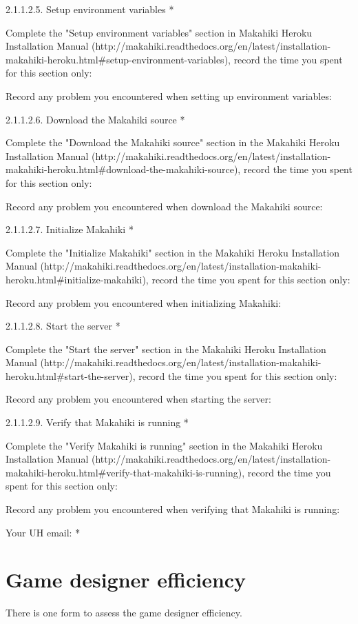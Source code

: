 2.1.1.2.5. Setup environment variables *

Complete the "Setup environment variables" section in Makahiki Heroku Installation Manual (http://makahiki.readthedocs.org/en/latest/installation-makahiki-heroku.html\#setup-environment-variables), record the time you spent for this section only:

Record any problem you encountered when setting up environment variables:

2.1.1.2.6. Download the Makahiki source *

Complete the "Download the Makahiki source" section in the Makahiki Heroku Installation Manual (http://makahiki.readthedocs.org/en/latest/installation-makahiki-heroku.html\#download-the-makahiki-source), record the time you spent for this section only:

Record any problem you encountered when download the Makahiki source:

2.1.1.2.7. Initialize Makahiki *

Complete the "Initialize Makahiki" section in the Makahiki Heroku Installation Manual (http://makahiki.readthedocs.org/en/latest/installation-makahiki-heroku.html\#initialize-makahiki), record the time you spent for this section only:

Record any problem you encountered when initializing Makahiki:

2.1.1.2.8. Start the server *

Complete the "Start the server" section in the Makahiki Heroku Installation Manual (http://makahiki.readthedocs.org/en/latest/installation-makahiki-heroku.html\#start-the-server), record the time you spent for this section only:

Record any problem you encountered when starting the server:

2.1.1.2.9. Verify that Makahiki is running *

Complete the "Verify Makahiki is running" section in the Makahiki Heroku Installation Manual (http://makahiki.readthedocs.org/en/latest/installation-makahiki-heroku.html\#verify-that-makahiki-is-running), record the time you spent for this section only:

Record any problem you encountered when verifying that Makahiki is running:

Your UH email: *

\section{Game designer efficiency}
There is one form to assess the game designer efficiency.

